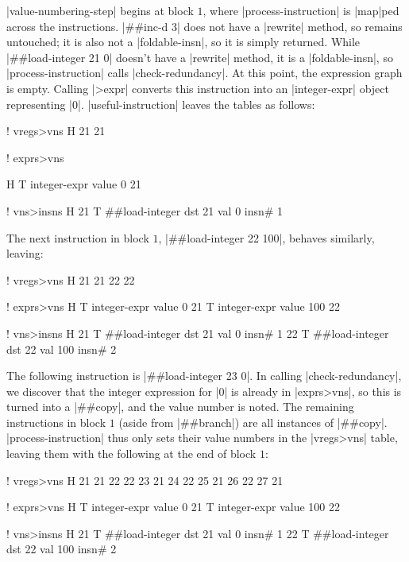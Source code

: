 \factor|value-numbering-step| begins at block $1$, where
\factor|process-instruction| is \factor|map|ped across the instructions.
%
\factor|##inc-d 3|
%
does not have a \factor|rewrite| method, so remains untouched; it is also not a
\factor|foldable-insn|, so it is simply returned.  While
%
\factor|##load-integer 21 0|
%
doesn't have a \factor|rewrite| method, it is a \factor|foldable-insn|, so
\factor|process-instruction| calls \factor|check-redundancy|.  At this point,
the expression graph is empty.  Calling \factor|>expr| converts this
instruction into an \factor|integer-expr| object representing \factor|0|.
\factor|useful-instruction| leaves the tables as follows:
%
  \begin{factorcode}
    ! vregs>vns
    H{ { 21 21 } }

    ! exprs>vns

    H{ { T{ integer-expr { value 0 } } 21 } }

    ! vns>insns
    H{
        { 21 T{ ##load-integer { dst 21 } { val 0 } { insn# 1 } } }
    }
  \end{factorcode}
%
\noindent The next instruction in block $1$,
%
\factor|##load-integer 22 100|,
%
behaves similarly, leaving:
%
  \begin{factorcode}
    ! vregs>vns
    H{ { 21 21 } { 22 22 } }

    ! exprs>vns
    H{
        { T{ integer-expr { value 0 } } 21 }
        { T{ integer-expr { value 100 } } 22 }
    }

    ! vns>insns
    H{
        { 21 T{ ##load-integer { dst 21 } { val 0 } { insn# 1 } } }
        {
            22
            T{ ##load-integer { dst 22 } { val 100 } { insn# 2 } }
        }
    }
  \end{factorcode}
%
\noindent The following instruction is
%
\factor|##load-integer 23 0|.
%
In calling \factor|check-redundancy|, we discover that the integer expression
for \factor|0| is already in \factor|exprs>vns|, so this is turned into a
\factor|##copy|, and the value number is noted.  The remaining instructions in
block $1$ (aside from \factor|##branch|) are all instances of \factor|##copy|.
\factor|process-instruction| thus only sets their value numbers in the
\factor|vregs>vns| table, leaving them with the following at the end of block
$1$:
%
  \begin{factorcode}
    ! vregs>vns
    H{
        { 21 21 }
        { 22 22 }
        { 23 21 }
        { 24 22 }
        { 25 21 }
        { 26 22 }
        { 27 21 }
    }

    ! exprs>vns
    H{
        { T{ integer-expr { value 0 } } 21 }
        { T{ integer-expr { value 100 } } 22 }
    }

    ! vns>insns
    H{
        { 21 T{ ##load-integer { dst 21 } { val 0 } { insn# 1 } } }
        {
            22
            T{ ##load-integer { dst 22 } { val 100 } { insn# 2 } }
        }
    }
  \end{factorcode}

